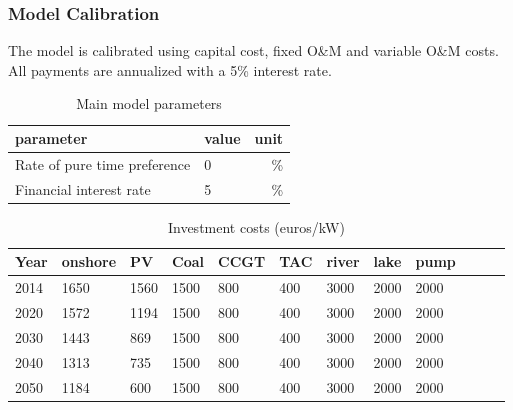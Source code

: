
\clearpage

\subsubsection{Model Calibration}

\label{app:calibration}

The model is calibrated using capital cost, fixed O\&M and variable O\&M costs. All payments are annualized with a 5\% interest rate. 


\begin{table}[!ht]
	\centering
	\caption{Main model parameters}
	\begin{tabular}{llr}
		\toprule
		parameter&value&unit\\
		\midrule
		Rate of pure time preference &0&\%\\
		Financial interest rate&5&\%\\
		\bottomrule
	\end{tabular}
\end{table}

\begin{table}[!ht]
	\centering
	\caption{Investment costs (euros/kW)}
	\label{tab:Investment _costs}
	\begin{adjustbox}{width=1\textwidth}
	\small
	\begin{tabular}{llllllllllll}
		\toprule
		 Year & onshore & PV & Coal & CCGT & TAC & river & lake & pump  \\
		\midrule
		2014 & 1650 & 1560 & 1500 & 800 & 400 & 3000 & 2000 & 2000  \\
		2020 & 1572 & 1194 & 1500 & 800 & 400 & 3000 & 2000 & 2000 \\
		2030 & 1443 & 869 & 1500 & 800 & 400 & 3000 & 2000 & 2000  \\
		2040 & 1313 & 735 & 1500 & 800 & 400 & 3000 & 2000 & 2000 \\
		2050 & 1184 & 600 & 1500 & 800 & 400 & 3000 & 2000 & 2000 \\
		\bottomrule
	\end{tabular}
\end{adjustbox}
\end{table}

